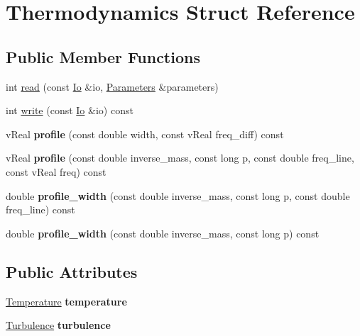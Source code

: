 \hypertarget{structThermodynamics}{}\section{Thermodynamics Struct Reference}
\label{structThermodynamics}
\subsection*{Public Member Functions}
\begin{DoxyCompactItemize}
\item 
int \mbox{\hyperlink{structThermodynamics_a995e360022e63d572760d3a694814fda}{read}} (const \mbox{\hyperlink{structIo}{Io}} \&io, \mbox{\hyperlink{classParameters}{Parameters}} \&parameters)
\item 
int \mbox{\hyperlink{structThermodynamics_ac3f2f42f51d687a833b278723da9460f}{write}} (const \mbox{\hyperlink{structIo}{Io}} \&io) const
\item 
\mbox{\label{structThermodynamics_a742d561124ffa6e3eb62aeb56ea64e0d}} 
v\+Real {\bfseries profile} (const double width, const v\+Real freq\+\_\+diff) const
\item 
\mbox{\label{structThermodynamics_a4225e85589c6859c4870dad0753a4374}} 
v\+Real {\bfseries profile} (const double inverse\+\_\+mass, const long p, const double freq\+\_\+line, const v\+Real freq) const
\item 
\mbox{\label{structThermodynamics_a4be5974c0bbfdaacd0fe84eb42f02dcd}} 
double {\bfseries profile\+\_\+width} (const double inverse\+\_\+mass, const long p, const double freq\+\_\+line) const
\item 
\mbox{\label{structThermodynamics_ad7b933687c4161efba31ee6f2c46e74d}} 
double {\bfseries profile\+\_\+width} (const double inverse\+\_\+mass, const long p) const
\end{DoxyCompactItemize}
\subsection*{Public Attributes}
\begin{DoxyCompactItemize}
\item 
\mbox{\label{structThermodynamics_a1165840a9afba6fd0c9b2900233a781f}} 
\mbox{\hyperlink{structTemperature}{Temperature}} {\bfseries temperature}
\item 
\mbox{\label{structThermodynamics_a22fc4dfe5e65270192f7a3a78839b480}} 
\mbox{\hyperlink{structTurbulence}{Turbulence}} {\bfseries turbulence}
\end{DoxyCompactItemize}


